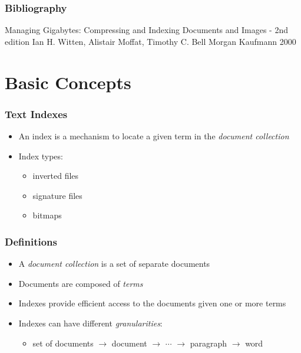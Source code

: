 \documentclass[svgnames]{beamer}
\subtitle{Efficient Index Construction}
\begin{document}
\maketitle
\makeoutline

\begin{frame}
    \frametitle{Bibliography}
    
    Managing Gigabytes: Compressing and Indexing Documents and Images - 2nd
    edition Ian H. Witten, Alistair Moffat, Timothy C. Bell Morgan Kaufmann
    2000

\end{frame}

\section{Basic Concepts}

\begin{frame}
    \frametitle{Text Indexes}

    \begin{block}{}
        \begin{itemize}
        \item An index is a mechanism to locate a given term in the \emph{document
              collection}
        \item Index types:
            \begin{itemize}
            \item \alert{inverted files}
            \item signature files
            \item bitmaps
            \end{itemize}
        \end{itemize}
    \end{block}

\end{frame}


\begin{frame}
    \frametitle{Definitions}

    \begin{block}{}
        \begin{itemize}
        \item A \emph{document collection} is a set of separate documents
        \item Documents are composed of \emph{terms}
        \item Indexes provide efficient access to the documents given one or more
            terms
        \item Indexes can have different \emph{granularities}:
            \begin{itemize}
            \item set of documents $\rightarrow$ document $\rightarrow$ $\cdots$
                $\rightarrow$ paragraph $\rightarrow$ word
            \end{itemize}
        \end{itemize}
    \end{block}

\end{frame}
\end{document}
